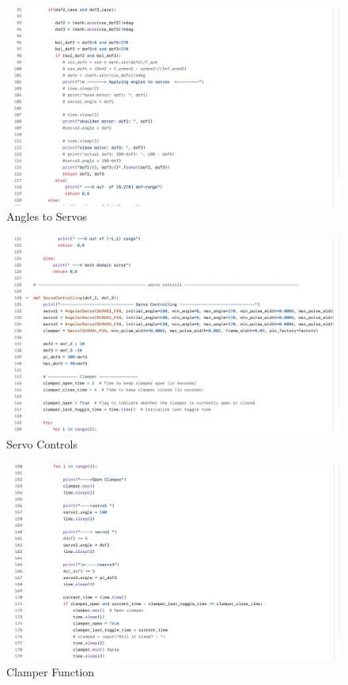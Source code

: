 \begin{figure}[h]
    \centering
    \includegraphics[width=1\linewidth]{Graphics/4anglesToservos.jpg}
    \caption{Angles to Servos}
    \label{fig:enter-label}
\end{figure}
\begin{figure}[h]
    \centering
    \includegraphics[width=1\linewidth]{Graphics/5servoControl.jpg}
    \caption{Servo Controls}
    \label{fig:enter-label}
\end{figure}
\begin{figure}[h]
    \centering
    \includegraphics[width=1\linewidth]{Graphics/6clamperOperation.jpg}
    \caption{Clamper Function}
    \label{fig:enter-label}
\end{figure}
